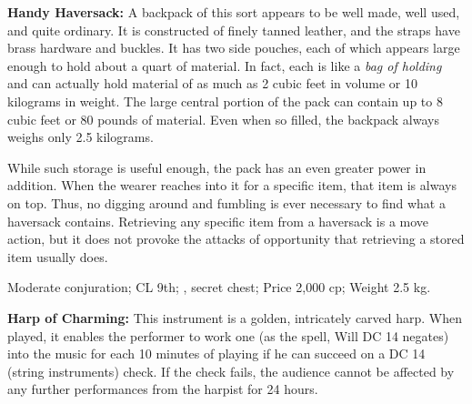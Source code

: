 




\textbf{Handy Haversack:} A backpack of this sort appears to be well made, well used, and quite ordinary. It is constructed of finely tanned leather, and the straps have brass hardware and buckles. It has two side pouches, each of which appears large enough to hold about a quart of material. In fact, each is like a \emph{bag of holding} and can actually hold material of as much as 2 cubic feet in volume or 10 kilograms in weight. The large central portion of the pack can contain up to 8 cubic feet or 80 pounds of material. Even when so filled, the backpack always weighs only 2.5 kilograms.

While such storage is useful enough, the pack has an even greater power in addition. When the wearer reaches into it for a specific item, that item is always on top. Thus, no digging around and fumbling is ever necessary to find what a haversack contains. Retrieving any specific item from a haversack is a move action, but it does not provoke the attacks of opportunity that retrieving a stored item usually does.

Moderate conjuration; CL 9th; , secret chest; Price 2,000 cp; Weight 2.5 kg.



\textbf{Harp of Charming:} This instrument is a golden, intricately carved harp. When played, it enables the performer to work one  (as the spell, Will DC 14 negates) into the music for each 10 minutes of playing if he can succeed on a DC 14  (string instruments) check. If the check fails, the audience cannot be affected by any further performances from the harpist for 24 hours.

